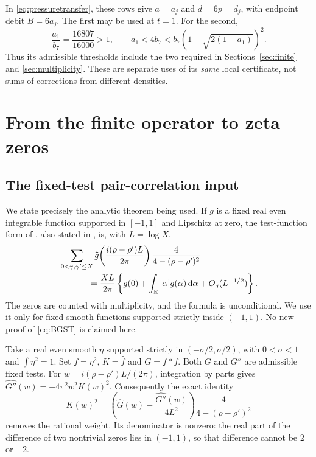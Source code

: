 \documentclass[11pt]{amsart}
\numberwithin{equation}{section}
\newcommand{\R}{\mathbb R}
\newcommand{\dd}{\,\mathrm d}
\begin{document}
In \eqref{eq:pressuretransfer}, these rows give $a=a_j$ and
$d=6p=d_j$, with endpoint debit $B=6a_j$. The first may be used at
$t=1$. For the second,
\[
 \frac{a_1}{b_7}=\frac{16807}{16000}>1,
 \qquad a_1<4b_7<b_7(1+\sqrt{2(1-a_1)})^2.
\]
Thus its admissible thresholds include the two required in
Sections~\ref{sec:finite} and \ref{sec:multiplicity}. These are
separate uses of its \emph{same} local certificate, not sums of
corrections from different densities.

\section{From the finite operator to zeta zeros}
\label{sec:analytic}

\subsection{The fixed-test pair-correlation input}

We state precisely the analytic theorem being used. If $g$ is a fixed
real even integrable function supported in $[-1,1]$ and Lipschitz at
zero, the test-function form of \cite[Lemma 5]{BGST}, also stated in
\cite[Lemma 3.1]{Lamzouri}, is, with $L=\log X$,
\begin{align}
 &\sum_{0<\gamma,\gamma'\le X}
 \widehat g\!\left(\frac{i(\rho-\rho')L}{2\pi}\right)
       \frac4{4-(\rho-\rho')^2}\notag\\
 &\hspace{12mm}=\frac{XL}{2\pi}
  \left\{g(0)+\int_\R|\alpha|g(\alpha)\dd\alpha
                      +O_g(L^{-1/2})\right\}.
 \label{eq:BGST}
\end{align}
The zeros are counted with multiplicity, and the formula is unconditional.
We use it only for fixed smooth functions supported strictly inside
$(-1,1)$. No new proof of \eqref{eq:BGST} is claimed here.

Take a real even smooth $\eta$ supported strictly in
$(-\sigma/2,\sigma/2)$, with $0<\sigma<1$ and $\int\eta^2=1$.
Set $f=\eta^2$, $K=\widehat f$ and $G=f*f$. Both $G$ and $G''$
are admissible fixed tests. For
$w=i(\rho-\rho')L/(2\pi)$, integration by parts gives
$\widehat{G''}(w)=-4\pi^2w^2K(w)^2$. Consequently the exact
identity
\begin{equation}
 K(w)^2=\left(\widehat G(w)-\frac{\widehat{G''}(w)}{4L^2}\right)
                 \frac4{4-(\rho-\rho')^2}\label{eq:weightremoval}
\end{equation}
removes the rational weight. Its denominator is nonzero: the real
part of the difference of two nontrivial zeros lies in $(-1,1)$,
so that difference cannot be $2$ or $-2$.
\end{document}
